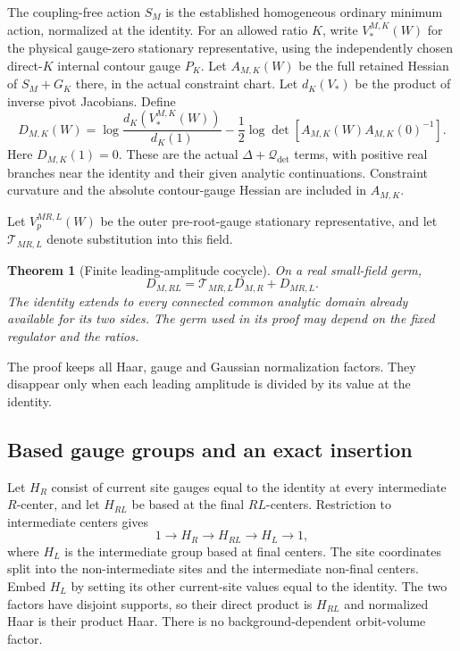 \documentclass[11pt]{article}
\newtheorem{theorem}{Theorem}[section]
\theoremstyle{remark}
\begin{document}
The coupling-free action $S_M$ is the established homogeneous
ordinary minimum action, normalized at the identity. For an
allowed ratio $K$, write $V_*^{M,K}(W)$ for the physical
gauge-zero stationary representative, using the independently
chosen direct-$K$ internal contour gauge $P_K$. Let
$A_{M,K}(W)$ be the full retained Hessian of $S_M+G_K$ there,
in the actual constraint chart. Let $d_K(V_*)$ be the product
of inverse pivot Jacobians. Define
\begin{equation}
 D_{M,K}(W)
  =\log\frac{d_K(V_*^{M,K}(W))}{d_K(1)}
   -\frac12\log\det\!\left[
         A_{M,K}(W)A_{M,K}(0)^{-1}\right].
 \label{olc-leading}
\end{equation}
Here $D_{M,K}(1)=0$. These are the actual $\Delta+\mathcal Q_{\det}$
terms, with positive real branches near the identity and their
given analytic continuations. Constraint curvature and the
absolute contour-gauge Hessian are included in $A_{M,K}$.

Let $V_p^{MR,L}(W)$ be the outer pre-root-gauge stationary
representative, and let $\mathcal T_{MR,L}$ denote substitution
into this field.

\begin{theorem}[Finite leading-amplitude cocycle]
\label{olc-theorem}
On a real small-field germ,
\begin{equation}
 D_{M,RL}
   =\mathcal T_{MR,L}D_{M,R}+D_{MR,L}.
 \label{olc-cocycle}
\end{equation}
The identity extends to every connected common analytic domain
already available for its two sides. The germ used in its proof
may depend on the fixed regulator and the ratios.
\end{theorem}

The proof keeps all Haar, gauge and Gaussian normalization
factors. They disappear only when each leading amplitude is
divided by its value at the identity.

\subsection{Based gauge groups and an exact insertion}
\label{olc-groups-section}

Let $H_R$ consist of current site gauges equal to the identity
at every intermediate $R$-center, and let $H_{RL}$ be based
at the final $RL$-centers. Restriction to intermediate centers
gives
\begin{equation}
 1\longrightarrow H_R\longrightarrow H_{RL}
       \longrightarrow H_L\longrightarrow1,
 \label{olc-group-sequence}
\end{equation}
where $H_L$ is the intermediate group based at final centers.
The site coordinates split into the non-intermediate sites
and the intermediate non-final centers. Embed $H_L$ by setting
its other current-site values equal to the identity. The two
factors have disjoint supports, so their direct product is
$H_{RL}$ and normalized Haar is their product Haar.
There is no background-dependent orbit-volume factor.
\end{document}
